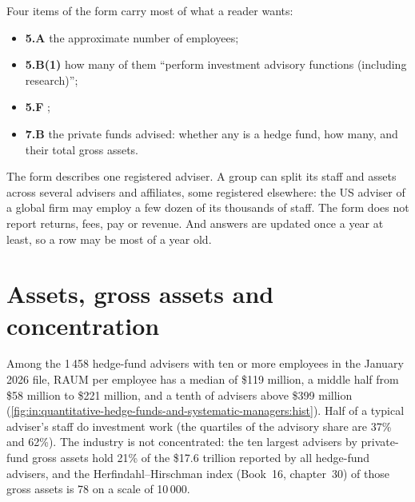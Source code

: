 Four items of the form carry most of what a reader wants:
\begin{itemize}
\item \textbf{5.A} the approximate number of employees;
\item \textbf{5.B(1)} how many of them ``perform investment advisory functions (including research)'';
\item \textbf{5.F} ;
\item \textbf{7.B} the private funds advised: whether any is a hedge fund, how many, and their total gross assets.
\end{itemize}

\begin{remark}\label{rem:in:quantitative-hedge-funds-and-systematic-managers:limits}
The form describes one registered adviser. A group can split its staff and assets across several advisers and
affiliates, some registered elsewhere: the US adviser of a global firm may employ a few dozen of its thousands of
staff. The form does not report returns, fees, pay or revenue. And answers are updated once a year at least, so a row
may be most of a year old.
\end{remark}

\section{Assets, gross assets and concentration}

Among the 1\,458 hedge-fund advisers with ten or more employees in the January 2026 file, RAUM per employee has a
median of \$119 million, a middle half from \$58 million to \$221 million, and a tenth of advisers above \$399 million
(\cref{fig:in:quantitative-hedge-funds-and-systematic-managers:hist}). Half of a typical adviser's staff do investment
work (the quartiles of the advisory share are 37\% and 62\%). The industry is not concentrated: the ten largest
advisers by private-fund gross assets hold 21\% of the \$17.6 trillion reported by all hedge-fund advisers, and the
Herfindahl--Hirschman index (Book~16, chapter~30) of those gross assets is 78 on a scale of 10\,000.


